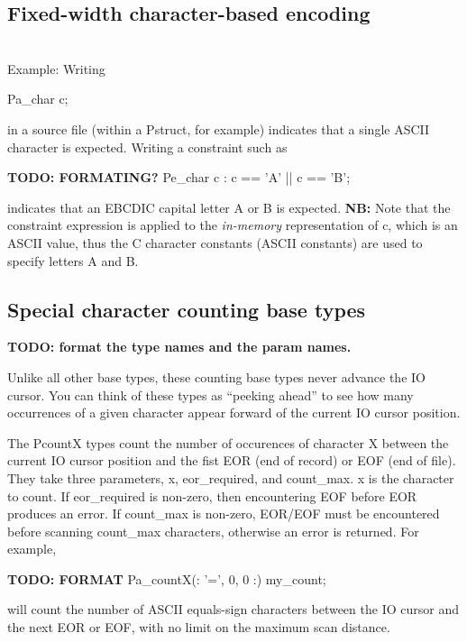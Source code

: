 \subsection{Fixed-width character-based encoding}

\aedBegin{}
\aedEnd{}
\\[1ex]
Example:  Writing
\begin{tinycodeaux}{\leftmargin=0in}
Pa\_char  c;
\end{tinycodeaux}
in a \PADSL{} source file (within a Pstruct, for example) indicates
that a single ASCII character is expected.  Writing a constraint
such as 
\begin{tinycodeaux}{\leftmargin=0in}
{\bf TODO: FORMATING? }
Pe\_char  c : c == 'A' || c == 'B';
\end{tinycodeaux}
indicates that an EBCDIC capital letter A or B is expected.
{\bf NB:}\/ Note that the constraint expression is applied to the
{\em in-memory\/} representation of c, which is an ASCII value,
thus the C character constants (ASCII constants)
are used to specify letters A and B.

\subsection{Special character counting base types}

\aedBegin{}
\aedEnd{}

{\bf TODO: format the type names and the param names.}

Unlike all other base types, these counting base types
never advance the IO cursor.  You can think of these types as
``peeking ahead'' to see how many occurrences of a given character
appear forward of the current IO cursor position.

The PcountX types count the number of occurences of character X
between the current IO cursor position and the fist EOR (end of
record) or EOF (end of file).  They take three parameters, x,
eor\_required, and count\_max.  x is the character to count.  If
eor\_required is non-zero, then encountering EOF before EOR produces
an error.  If count\_max is non-zero, EOR/EOF must be encountered
before scanning count\_max characters, otherwise an error is returned.
For example,
\begin{tinycodeaux}{\leftmargin=0in}
{\bf TODO: FORMAT }
Pa\_countX(: '=', 0, 0 :) my\_count;
\end{tinycodeaux}
will count the number of ASCII equals-sign characters between
the IO cursor and the next EOR or EOF, with no limit on
the maximum scan distance.

